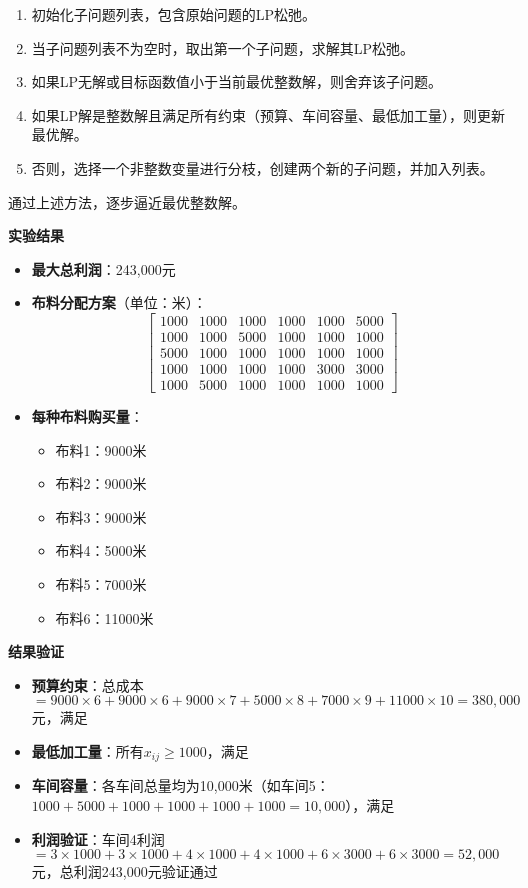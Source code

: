 \begin{enumerate}
    \item 初始化子问题列表，包含原始问题的LP松弛。
    \item 当子问题列表不为空时，取出第一个子问题，求解其LP松弛。
    \item 如果LP无解或目标函数值小于当前最优整数解，则舍弃该子问题。
    \item 如果LP解是整数解且满足所有约束（预算、车间容量、最低加工量），则更新最优解。
    \item 否则，选择一个非整数变量进行分枝，创建两个新的子问题，并加入列表。
\end{enumerate}

通过上述方法，逐步逼近最优整数解。

\textbf{实验结果}
\begin{itemize}
    \item \textbf{最大总利润}：243,000元
    \item \textbf{布料分配方案}（单位：米）：
    \[
    \begin{bmatrix}
    1000 & 1000 & 1000 & 1000 & 1000 & 5000 \\
    1000 & 1000 & 5000 & 1000 & 1000 & 1000 \\
    5000 & 1000 & 1000 & 1000 & 1000 & 1000 \\
    1000 & 1000 & 1000 & 1000 & 3000 & 3000 \\
    1000 & 5000 & 1000 & 1000 & 1000 & 1000
    \end{bmatrix}
    \]
    \item \textbf{每种布料购买量}：
    \begin{itemize}
        \item 布料1：9000米
        \item 布料2：9000米
        \item 布料3：9000米
        \item 布料4：5000米
        \item 布料5：7000米
        \item 布料6：11000米
    \end{itemize}
\end{itemize}

\textbf{结果验证}
\begin{itemize}
    \item \textbf{预算约束}：总成本$=9000\times6+9000\times6+9000\times7+5000\times8+7000\times9+11000\times10=380,000$元，满足
    \item \textbf{最低加工量}：所有$x_{ij} \geq 1000$，满足
    \item \textbf{车间容量}：各车间总量均为10,000米（如车间5：$1000+5000+1000+1000+1000+1000=10,000$），满足
    \item \textbf{利润验证}：车间4利润$=3\times1000+3\times1000+4\times1000+4\times1000+6\times3000+6\times3000=52,000$元，总利润243,000元验证通过
\end{itemize}

